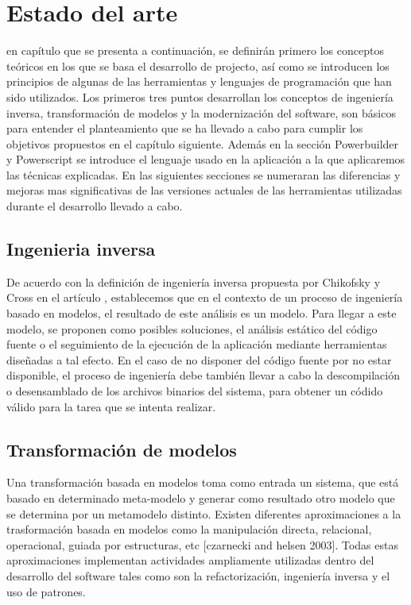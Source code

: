 \chapter{Estado del arte}
\label{chap:Estado del arte}

 en capítulo que se presenta a continuación, se definirán primero los conceptos teóricos en los que se basa el desarrollo de
projecto, así como se introducen los principios de algunas de las herramientas y lenguajes de programación que han sido utilizados.
Los primeros tres puntos desarrollan los conceptos de ingeniería inversa, transformación de modelos y la modernización del software,
son básicos para entender el planteamiento que se ha llevado a cabo para cumplir los objetivos propuestos en el capítulo siguiente. 
Además en la sección Powerbuilder y Powerscript se introduce el lenguaje usado en la aplicación a la que aplicaremos las técnicas 
explicadas. En las siguientes secciones se numeraran las diferencias y mejoras mas significativas de las versiones actuales 
de las herramientas utilizadas durante el desarrollo llevado a cabo.

\section{Ingenieria inversa} \label{sec:Ingeniería inversa}

De acuerdo con la definición de ingeniería inversa propuesta por Chikofsky y Cross en el
artículo \cite{Chikofsky1990}, establecemos que en el contexto de un proceso de
ingeniería basado en modelos, el resultado de este análisis es un modelo. Para llegar a este modelo,
se proponen como posibles soluciones, el análisis estático del código fuente o el seguimiento de la
ejecución de la aplicación mediante herramientas diseñadas a tal efecto. En el caso de no disponer
del código fuente por no estar disponible, el proceso de ingeniería debe también llevar a cabo
la descompilación o desensamblado de los archivos binarios del sistema, para obtener un códido
válido para la tarea que se intenta realizar.

\section{Transformación de modelos} \label{sec:Transformación de modelos}

Una transformación basada en modelos toma como entrada un sistema, que está basado en
determinado meta-modelo y generar como resultado otro modelo que se determina por un metamodelo
distinto. Existen diferentes aproximaciones a la trasformación basada en modelos como
la manipulación directa, relacional, operacional, guiada por estructuras, etc [czarnecki and helsen
2003]. Todas estas aproximaciones implementan actividades ampliamente utilizadas dentro del
desarrollo del software tales como son la refactorización, ingeniería inversa y el uso de patrones.

